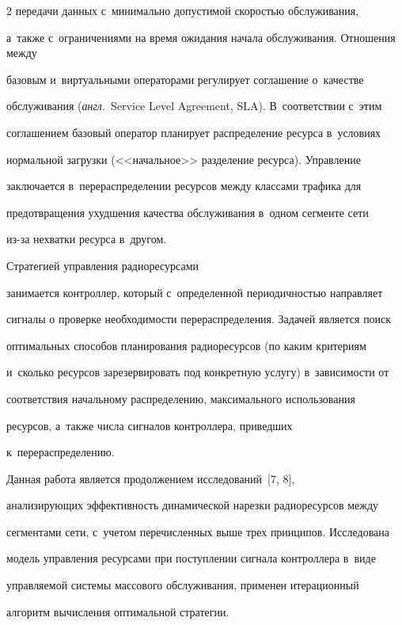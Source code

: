 \begin{multicols}{2}
передачи данных с~минимально допустимой скоростью обслуживания, 


а~также с~ограничениями на время ожидания начала обслуживания. Отношения между 


базовым и~виртуальными операторами регулирует соглашение о~качестве 


обслуживания (\textit{англ.}\ Service Level Agreement, SLA). В~соответствии с~этим 


соглашением базовый оператор планирует распределение ресурса в~условиях 


нормальной загрузки (<<начальное>> разделение ресурса). Управ\-ле\-ние 


заключается в~перераспределении ресурсов между классами трафика для 


предотвращения ухудшения качества обслуживания в~одном сегменте сети 


из-за нехватки ресурса в~другом. 





Стратегией управ\-ле\-ния радиоресурсами 


занимается контроллер, который с~определенной периодичностью направляет 


сигналы о проверке необходимости перераспределения. Задачей является поиск 


оптимальных способов планирования радиоресурсов (по каким критериям 


и~сколько ресурсов зарезервировать под конкретную услугу) в~зависимости от 


соответствия начальному распределению, максимального использования 


ресурсов, а~также чис\-ла сигналов контроллера, приведших 


к~перераспределению. 











  Данная работа является продолжением исследований~[7, 8], 


анализирующих эф\-фек\-тив\-ность динамической нарезки радиоресурсов между 


сегментами сети, с~учетом перечисленных выше трех \mbox{принципов}. Исследована 


модель управ\-ле\-ния ресурсами при поступлении сигнала контроллера в~виде 


управ\-ля\-емой сис\-те\-мы массового обслуживания, применен итерационный 


алгоритм вы\-чис\-ле\-ния оптимальной стратегии.





\end{multicols}





